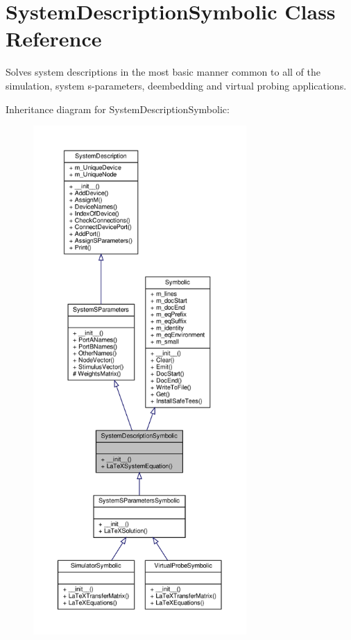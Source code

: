 \hypertarget{classSignalIntegrity_1_1SystemDescriptions_1_1SystemDescriptionSymbolic_1_1SystemDescriptionSymbolic}{}\section{System\+Description\+Symbolic Class Reference}
\label{classSignalIntegrity_1_1SystemDescriptions_1_1SystemDescriptionSymbolic_1_1SystemDescriptionSymbolic}


Solves system descriptions in the most basic manner common to all of the simulation, system s-\/parameters, deembedding and virtual probing applications.  




Inheritance diagram for System\+Description\+Symbolic\+:\nopagebreak
\begin{figure}[H]
\begin{center}
\leavevmode
\includegraphics[height=550pt]{classSignalIntegrity_1_1SystemDescriptions_1_1SystemDescriptionSymbolic_1_1SystemDescriptionSymbolic__inherit__graph}
\end{center}
\end{figure}


